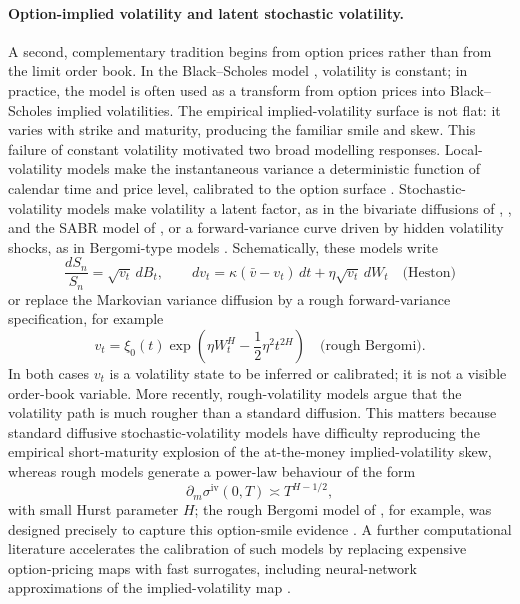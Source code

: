 \documentclass[11pt]{article}
\theoremstyle{plain}
\theoremstyle{definition}
\begin{document}
\paragraph{Option-implied volatility and latent stochastic volatility.}
A second, complementary tradition begins from option prices rather than from the
limit order book. In the Black--Scholes model \citep{blackscholes1973}, volatility is
constant; in practice, the model is often used as a transform from option prices into
Black--Scholes implied volatilities. The empirical implied-volatility surface is not
flat: it varies with strike and maturity, producing the familiar smile and skew. This
failure of constant volatility motivated two broad modelling responses. Local-volatility
models make the instantaneous variance a deterministic function of calendar time and
price level, calibrated to the option surface \citep{dupire1994}. Stochastic-volatility
models make volatility a latent factor, as in the bivariate diffusions of
\citet{hullwhite1987}, \citet{heston1993}, and the SABR model of \citet{hagan2002},
or a forward-variance curve driven by hidden volatility shocks, as in Bergomi-type
models \citep{bergomi2016}. Schematically, these models write
\[
  \frac{dS_n}{S_n}=\sqrt{v_t}\,dB_t,
  \qquad
  dv_t=\kappa(\bar v-v_t)\,dt+\eta\sqrt{v_t}\,dW_t
  \quad\text{(Heston)}
\]
or replace the Markovian variance diffusion by a rough forward-variance specification,
for example
\[
  v_t=\xi_0(t)\exp\!\left(\eta W_t^H-\frac12\eta^2 t^{2H}\right)
  \quad\text{(rough Bergomi)}.
\]
In both cases $v_t$ is a volatility state to be inferred or calibrated; it is not a
visible order-book variable. More recently, rough-volatility models argue that the
volatility path is much rougher than a standard diffusion. This matters because
standard diffusive stochastic-volatility models have difficulty reproducing the
empirical short-maturity explosion of the at-the-money implied-volatility skew, whereas
rough models generate a power-law behaviour of the form
\[
  \partial_m \sigma^{\mathrm{iv}}(0,T) \asymp T^{H-1/2},
\]
with small Hurst parameter $H$; the rough Bergomi model of \citet{bayer2016}, for
example, was designed precisely to capture this option-smile evidence
\citep{gatheral2011,gatheral2018}. A further computational literature accelerates the
calibration of such models by replacing expensive option-pricing maps with fast
surrogates, including neural-network approximations of the implied-volatility map
\citep{bayer2019deepcalibration,horvath2021deeplearning}.
\end{document}
